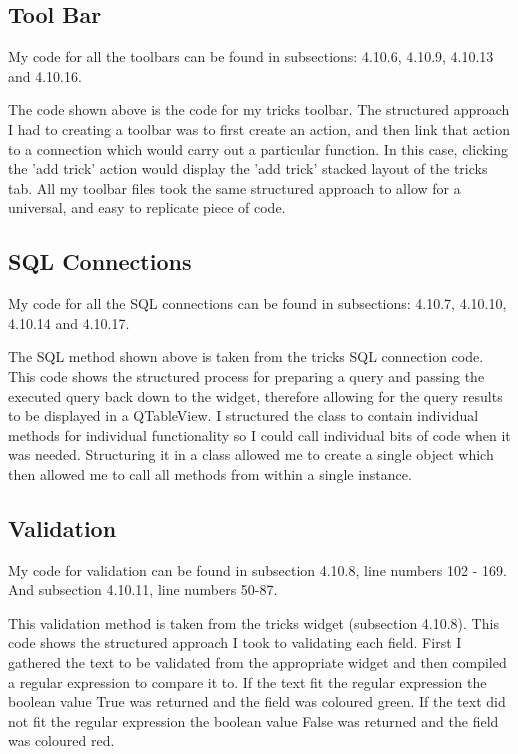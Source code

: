 \subsection{Tool Bar}

My code for all the toolbars can be found in subsections: 4.10.6, 4.10.9, 4.10.13 and 4.10.16.


The code shown above is the code for my tricks toolbar. The structured approach I had to creating a toolbar was to first create an action, and then link that action to a connection which would carry out a particular function. In this case, clicking the 'add trick' action would display the 'add trick' stacked layout of the tricks tab. All my toolbar files took the same structured approach to allow for a universal, and easy to replicate piece of code.

\subsection{SQL Connections}

My code for all the SQL connections can be found in subsections: 4.10.7, 4.10.10, 4.10.14 and 4.10.17.


The SQL method shown above is taken from the tricks SQL connection code. This code shows the structured process for preparing a query and passing the executed query back down to the widget, therefore allowing for the query results to be displayed in a QTableView. I structured the class to contain individual methods for individual functionality so I could call individual bits of code when it was needed. Structuring it in a class allowed me to create a single object which then allowed me to call all methods from within a single instance.

\subsection{Validation}

My code for validation can be found in subsection 4.10.8, line numbers 102 - 169. And subsection 4.10.11, line numbers 50-87.


This validation method is taken from the tricks widget (subsection 4.10.8). This code shows the structured approach I took to validating each field. First I gathered the text to be validated from the appropriate widget and then compiled a regular expression to compare it to. If the text fit the regular expression the boolean value True was returned and the field was coloured green. If the text did not fit the regular expression the boolean value False was returned and the field was coloured red.


